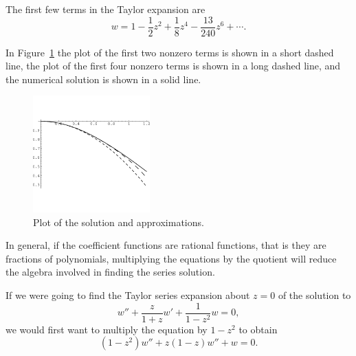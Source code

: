 \begin{Example}
  The first few terms in the Taylor expansion are
  \[ \boxed{ w = 1 - \frac{1}{2} z^2 + \frac{1}{8} z^4- \frac{13}{240}z^6 
    + \cdots.}\]

  In Figure~\ref{taylor_conv} the plot of the first two nonzero 
  terms is shown in a short
  dashed line, the plot of the first four nonzero terms is shown in a long dashed
  line, and the numerical solution is shown in a solid line.

  \begin{figure}[tb!]
    \begin{center} 
      \includegraphics[width=0.4\textwidth]{ode/series/conv1}
    \end{center}
    \caption{Plot of the solution and approximations.}
    \label{taylor_conv}
  \end{figure}

\end{Example}











In general, if the coefficient functions are rational functions, that is
they are fractions of polynomials, multiplying the equations
by the quotient will reduce the algebra involved in finding the series
solution.




\begin{Example}
  If we were going to find the Taylor series expansion about $z=0$
  of the solution to
  \[ w'' + \frac{z}{1+z} w' + \frac{1}{1-z^2} w = 0,\]
  we would first want to multiply the equation by $1-z^2$ to obtain
  \[ (1-z^2) w'' + z (1-z) w'' + w = 0. \]
\end{Example}


























